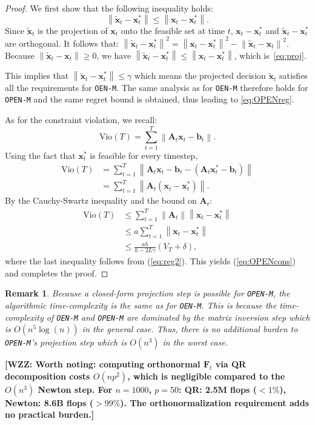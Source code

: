 \documentclass[journal,twoside,web]{ieeecolor}
\newtheorem{remark}{Remark}
\newcommand{\norm}[1]{\left\lVert#1\right\rVert}
\newcommand{\xx}{\mathbf{x}}
\newcommand{\bb}{\mathbf{b}}
\renewcommand{\AA}{\mathbf{A}}
\newcommand{\FF}{\mathbf{F}}
\newcommand{\WZZsuggestion}[1]{{\color{green2}\bf{[WZZ: #1]}}}
\begin{document}
\begin{proof}
    We first show that the following inequality holds:
\begin{equation}\label{eq:proj}\norm{\tilde{\xx}_t-\xx_t^*}\le \norm{\xx_t-\xx_t^*}.\end{equation}
Since $\tilde{\xx}_t$ is the projection of $\xx_t$ onto the feasible set at time $t$, $\xx_t-\xx_t^*$ and $\tilde{\xx}_t-\xx_t^*$ are orthogonal. It follows that:
$\norm{\tilde{\xx}_t-\xx_t^*}^2 = \norm{\xx_t-\xx_t^*}^2-\norm{\tilde{\xx}_t-\xx_t}^2.$
Because $\norm{\tilde{\xx}_t-\xx_t}\ge 0$, we have $\norm{\tilde{\xx}_t-\xx_t^*} \le \norm{\xx_t-\xx_t^*}$, which is~\eqref{eq:proj}.

This implies that $\norm{\tilde{\xx}_t-\xx_t^*} \le \gamma$ which means the projected decision $\tilde{\xx}_t$ satisfies all the requirements for \texttt{OEN-M}. The same analysis as for \texttt{OEN-M} therefore holds for \texttt{OPEN-M} and the same regret bound is obtained, thus leading to \eqref{eq:OPENreg}.

As for the constraint violation, we recall:
\[\text{Vio}(T) = \sum\limits_{t=1}^{T}\norm{\AA_t\xx_t-\bb_t}.\]
Using the fact that $\xx_t^*$ is feasible for every timestep,
\begin{align*}
    \text{Vio}(T) &= \sum\limits_{t=1}^{T}\norm{\AA_t\xx_t-\mathbf{b}_t-(\AA_t\xx_t^*-\bb_t)}\\
     &= \sum\limits_{t=1}^{T}\norm{\AA_t(\xx_t-\xx_t^*)}.
\end{align*}
By the Cauchy-Swartz inequality and the bound on $\AA_t$:
\begin{align*}
    \text{Vio}(T) &\le \sum\limits_{t=1}^{T}\norm{\mathbf{A}_t}\norm{\xx_t-\xx_t^*}\\
    &\le a\sum\limits_{t=1}^{T}\norm{\xx_t-\xx_t^*}\\
    &\le \frac{ah}{h-2L\gamma}(V_T+\delta),
\end{align*}
where the last inequality follows from (\ref{eq:reg2}). This yields (\ref{eq:OPENcons}) and completes the proof.
\end{proof}

\begin{remark}Because a closed-form projection step is possible for \texttt{OPEN-M}, the algorithmic time-complexity is the same as for \texttt{OEN-M}. This is because the time-complexity of \texttt{OEN-M} and \texttt{OPEN-M} are dominated by the matrix inversion step which is $O(n^5\log(n))$ in the general case. Thus, there is no additional burden to \texttt{OPEN-M}'s projection step which is $O(n^3)$ in the worst case.
\end{remark}
\WZZsuggestion{Worth noting: computing orthonormal $\FF_t$ via QR decomposition costs $O(np^2)$,
which is negligible compared to the $O(n^3)$ Newton step. For $n=1000$, $p=50$:
QR: 2.5M flops ($<1\%$), Newton: 8.6B flops ($>99\%$).
The orthonormalization requirement adds no practical burden.}
\end{document}

